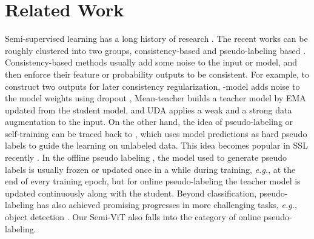 \documentclass{article}
\newcommand\eg{\emph{e.g.}}
\begin{document}
\section{Related Work}

Semi-supervised learning has a long history of research \cite{zhu2005semi,chapelle2009semi}. The recent works can be roughly clustered into two groups, consistency-based \cite{DBLP:conf/iclr/LaineA17,DBLP:conf/nips/TarvainenV17,DBLP:journals/pami/MiyatoMKI19,DBLP:conf/nips/XieDHL020,DBLP:conf/ijcai/VermaLKBL19} and pseudo-labeling based \cite{lee2013pseudo,DBLP:conf/nips/SohnBCZZRCKL20,DBLP:conf/cvpr/PhamDXL21,DBLP:conf/cvpr/CaiRMFTS21}. Consistency-based methods usually add some noise to the input or model, and then enforce their feature or probability outputs to be consistent. For example, to construct two outputs for later consistency regularization, -model \cite{DBLP:conf/iclr/LaineA17} adds noise to the model weights using dropout \cite{DBLP:journals/jmlr/SrivastavaHKSS14}, Mean-teacher \cite{DBLP:conf/nips/TarvainenV17} builds a teacher model by EMA updated from the student model, and UDA \cite{DBLP:conf/nips/XieDHL020} applies a weak and a strong data augmentation to the input. On the other hand, the idea of pseudo-labeling or self-training can be traced back to \cite{DBLP:journals/tit/Scudder65a,mclachlan1975iterative}, which uses model predictions as hard pseudo labels to guide the learning on unlabeled data. This idea becomes popular in SSL recently \cite{lee2013pseudo,DBLP:conf/nips/SohnBCZZRCKL20,DBLP:conf/cvpr/PhamDXL21,DBLP:conf/cvpr/CaiRMFTS21,DBLP:conf/cvpr/XieLHL20}. In the offline pseudo labeling \cite{lee2013pseudo,DBLP:conf/cvpr/XieLHL20}, the model used to generate pseudo labels is usually frozen or updated once in a while during training, \eg, at the end of every training epoch, but for online pseudo-labeling \cite{DBLP:conf/nips/SohnBCZZRCKL20,DBLP:conf/cvpr/CaiRMFTS21} the teacher model is updated continuously along with the student. Beyond classification, pseudo-labeling has also achieved promising progresses in more challenging tasks, \eg, object detection \cite{sohn2020simple,DBLP:conf/iclr/LiuMHKCZWKV21,wang22omni}. Our Semi-ViT also falls into the category of online pseudo-labeling. 
\end{document}
